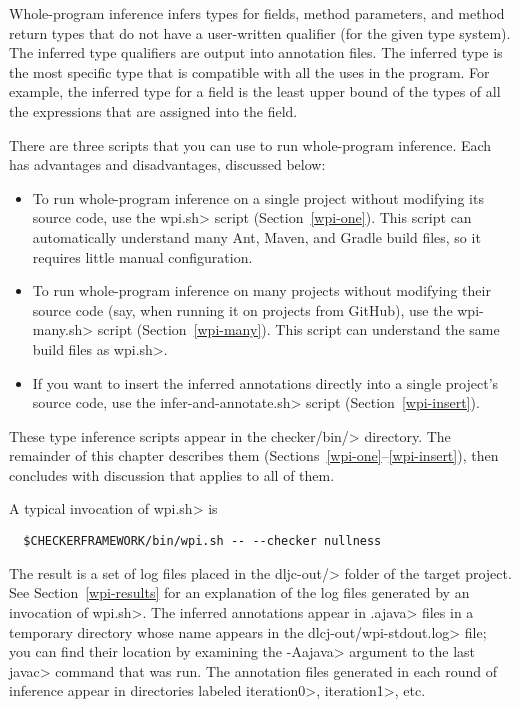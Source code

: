 
Whole-program inference
infers types for fields, method parameters, and method return types that do not
have a user-written qualifier (for the given type system).
The inferred type qualifiers are output into annotation files.
The inferred type is the most specific type that is compatible with all the
uses in the program.  For example, the inferred type for a field is the
least upper bound of the types of all the expressions that are assigned
into the field.

There are three scripts that you can use to run whole-program inference.
Each has advantages and disadvantages, discussed below:

\begin{itemize}
    \item
    To run whole-program inference on a single project without modifying its source code,
    use the \<wpi.sh> script (Section~\ref{wpi-one}). This script can automatically understand
    many Ant, Maven, and Gradle build files, so it requires little manual configuration.

    \item
    To run whole-program inference on many projects without modifying their source code
    (say, when running it on projects from GitHub), use the \<wpi-many.sh> script (Section~\ref{wpi-many}).
    This script can understand the same build files as \<wpi.sh>.

    \item
    If you want to insert the inferred annotations directly into a single
    project's source code, use the \<infer-and-annotate.sh> script (Section~\ref{wpi-insert}).
\end{itemize}

These type inference scripts appear in the \<checker/bin/> directory.
The remainder of this chapter describes them
(Sections~\ref{wpi-one}--\ref{wpi-insert}), then concludes with discussion
that applies to all of them.



A typical invocation of \<wpi.sh> is

\begin{Verbatim}
  $CHECKERFRAMEWORK/bin/wpi.sh -- --checker nullness
\end{Verbatim}

The result is a set of log files placed in the \<dljc-out/> folder of the
target project.
See Section~\ref{wpi-results} for an explanation of the log files generated by
an invocation of \<wpi.sh>.
The inferred annotations appear in \<.ajava> files in a
temporary directory whose name appears in the \<dlcj-out/wpi-stdout.log> file;
you can find their location by examining the \<-Aajava> argument
to the last \<javac> command that was run. The annotation files generated in
each round of inference appear in directories labeled \<iteration0>, \<iteration1>, etc.

